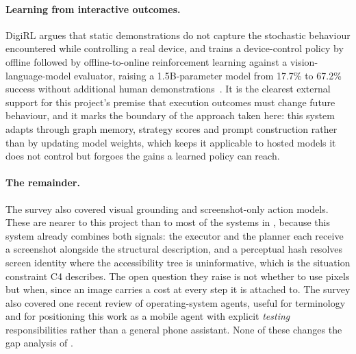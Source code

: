 \paragraph{Learning from interactive outcomes.} DigiRL argues that static
demonstrations do not capture the stochastic behaviour encountered while
controlling a real device, and trains a device-control policy by offline
followed by offline-to-online reinforcement learning against a
vision-language-model evaluator, raising a 1.5B-parameter model from 17.7\% to
67.2\% success without additional human demonstrations~\cite{digirl}. It is the
clearest external support for this project's premise that execution outcomes
must change future behaviour, and it marks the boundary of the approach taken
here: this system adapts through graph memory, strategy scores and prompt
construction rather than by updating model weights, which keeps it applicable
to hosted models it does not control but forgoes the gains a learned policy can
reach.

\paragraph{The remainder.} The survey also covered visual grounding and screenshot-only action models. These are nearer to this project than to most of the systems in , because this system already combines both signals: the executor and the planner each receive a screenshot alongside the structural description, and a perceptual hash resolves screen identity where the accessibility tree is uninformative, which is the situation constraint C4 describes. The open question they raise is not whether to use pixels but when, since an image carries a cost at every step it is attached to. The survey also covered one recent review of operating-system agents, useful for terminology and for positioning this work as a mobile agent with explicit \emph{testing} responsibilities rather than a general phone assistant.
None of these changes the gap analysis of .


